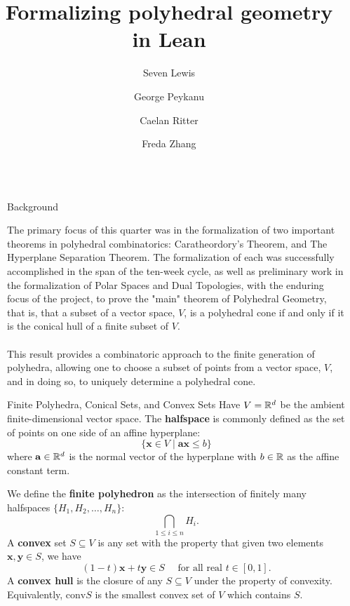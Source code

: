 \documentclass[final]{beamer}
\title{Formalizing polyhedral geometry in Lean}
\author{Seven Lewis \and George Peykanu \and Caelan Ritter \and Freda Zhang}
\institute[]{University of Washington}
\newlength{\sepwidth}
\newlength{\colwidth}
\newcommand{\separatorcolumn}{\begin{column}{\sepwidth}\end{column}}
\begin{document}
\begin{frame}[fragile]
    \begin{columns}[t]
        \separatorcolumn

        \begin{column}{\colwidth}

            \begin{block}{Background}
           
                The primary focus of this quarter was in the formalization of two important theorems in polyhedral combinatorics:
                Caratheordory's Theorem, and The Hyperplane Separation Theorem. The formalization of each was successfully accomplished in the
                span of the ten-week cycle, as well as preliminary work in the formalization of Polar Spaces and Dual Topologies, with the enduring
                focus of the project, to prove the "main" theorem of Polyhedral Geometry, that is, that a subset of a vector space, $V$, is a polyhedral cone
                if and only if it is the conical hull of a finite subset of $V$.
                \\\\This result provides a combinatoric approach to the finite generation of polyhedra, allowing one to choose a subset of points from a vector space,
                $V$, and in doing so, to uniquely determine a polyhedral cone.
                
            \end{block}

            \begin{block}{Finite Polyhedra, Conical Sets, and Convex Sets}
                Have $V = \mathbb{R}^d$ be the ambient finite-dimensional vector space. The \textbf{halfspace} is commonly defined as the set of points on one side of an affine hyperplane:
                $$ \{\mathbf{x} \in V \;|\; \mathbf{ax} \leq b\}$$
                where $\mathbf{a} \in \mathbb{R}^d$ is the normal vector of the hyperplane with $b \in \mathbb{R}$ as the affine constant term.

                We define the \textbf{finite polyhedron} as the intersection of finitely many halfspaces $\{H_1,H_2,\dots,H_n\}$:
                $$ \bigcap_{1 \leq i \leq n} H_i. $$
                A \textbf{convex} set $S \subseteq V$ is any set with the property that given two elements $\mathbf{x}, \mathbf{y} \in S$, we have
                $$ (1 - t)\mathbf{x} + t\mathbf{y} \in S \quad \text{ for all real } t \in [0,1].$$
                A \textbf{convex hull} is the closure of any $S \subseteq V$ under the property of convexity. Equivalently, $\text{conv}S$ is the smallest convex set of $V$ which contains $S$. 


\end{block}
\end{column}
\end{columns}
\end{frame}
\end{document}
